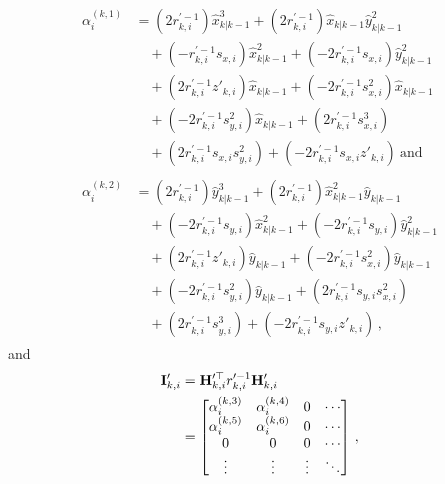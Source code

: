 \documentclass[10pt,letterpaper,oneside,twocolumn,journal]{IEEEtran}
\theoremstyle{definition}
\theoremstyle{definition}
\theoremstyle{remark}
\begin{document}
\begin{align*}
    \begin{split}
        \alpha_i^{(k,1)} &= (2r_{k,i}^{\prime-1})\hat{x}_{k|k-1}^3 + (2r_{k,i}^{\prime-1})\hat{x}_{k|k-1}\hat{y}_{k|k-1}^2 \\
        &\quad+ (-r_{k,i}^{\prime-1}s_{x,i})\hat{x}_{k|k-1}^2 + (-2r_{k,i}^{\prime-1}s_{x,i})\hat{y}_{k|k-1}^2 \\
        &\quad+ (2r_{k,i}^{\prime-1}z'_{k,i})\hat{x}_{k|k-1} + (-2r_{k,i}^{\prime-1}s_{x,i}^2)\hat{x}_{k|k-1}\\
        &\quad+ (-2r_{k,i}^{\prime-1}s_{y,i}^2)\hat{x}_{k|k-1} + (2r_{k,i}^{\prime-1}s_{x,i}^3) \\
        &\quad+ (2r_{k,i}^{\prime-1}s_{x,i}s_{y,i}^2) + (-2r_{k,i}^{\prime-1}s_{x,i} z'_{k,i})\ \textrm{and}
    \end{split}\\
    \begin{split}
        \alpha_i^{(k,2)} &= (2r_{k,i}^{\prime-1})\hat{y}_{k|k-1}^3 + (2r_{k,i}^{\prime-1})\hat{x}_{k|k-1}^2\hat{y}_{k|k-1} \\
        &\quad+ (-2r_{k,i}^{\prime-1}s_{y,i})\hat{x}_{k|k-1}^2 + (-2r_{k,i}^{\prime-1}s_{y,i})\hat{y}_{k|k-1}^2 \\
        &\quad+ (2r_{k,i}^{\prime-1}z'_{k,i})\hat{y}_{k|k-1} + (-2r_{k,i}^{\prime-1}s_{x,i}^2)\hat{y}_{k|k-1} \\
        &\quad+ (-2r_{k,i}^{\prime-1}s_{y,i}^2)\hat{y}_{k|k-1} + (2r_{k,i}^{\prime-1}s_{y,i}s_{x,i}^2) \\
        &\quad+ (2r_{k,i}^{\prime-1}s_{y,i}^3) + (-2r_{k,i}^{\prime-1}s_{y,i}z'_{k,i})\,,
    \end{split}
\end{align*}
and
\begin{equation}
    \begin{split}
        \mat{I}'_{k,i} &= \mat{H}_{k,i}^{\prime\top} r_{k,i}^{\prime-1}\mat{H}'_{k,i} \\
        &=
        \begin{bmatrix}
            \alpha_i^{(k,3)} & \alpha_i^{(k,4)} & 0 & \cdots \\
            \alpha_i^{(k,5)} & \alpha_i^{(k,6)} & 0 & \cdots\\
            0 & 0 & 0 & \cdots \\
            \vdots & \vdots & \vdots & \ddots
        \end{bmatrix}\,,
    \end{split} \label{eqn:hrh_linear_comb}
\end{equation}
\end{document}
